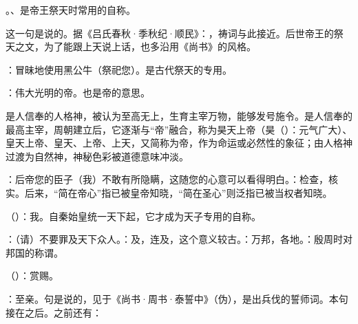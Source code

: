 {\begin{lyblobitemize}
\item {}。、是帝王祭天时常用的自称。

这一句是说的。据《吕氏春秋·季秋纪·顺民》：，祷词与此接近。后世帝王的祭天之文，为了能跟上天说上话，也多沿用《尚书》的风格。

\item {}：冒昧地使用黑公牛（祭祀您）。是古代祭天的专用。
\item {}：伟大光明的帝。也是帝的意思。

是人信奉的人格神，被认为至高无上，生育主宰万物，能够发号施令。是人信奉的最高主宰，周朝建立后，它逐渐与“帝”融合，称为昊天上帝（昊（）：元气广大）、皇天上帝、皇天、上帝、上天，又简称为帝，作为命运或必然性的象征；由人格神过渡为自然神，神秘色彩被道德意味冲淡。

\item {}：后帝您的臣子（我）不敢有所隐瞒，这随您的心意可以看得明白。：检查，核实。后来，“简在帝心”指已被皇帝知晓，“简在圣心”则泛指已被当权者知晓。
\item {}（）：我。自秦始皇统一天下起，它才成为天子专用的自称。
\item {}：（请）不要罪及天下众人。：及，连及，这个意义较古。：万邦，各地。：殷周时对邦国的称谓。
\item {}（）：赏赐。
\item {}：至亲。句是说的，见于《尚书·周书·泰誓中》（伪），是出兵伐的誓师词。本句接在之后。之前还有：


\end{lyblobitemize}}
